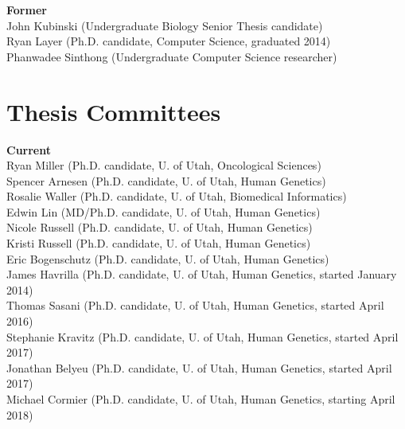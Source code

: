 \documentclass[margin,line]{cv}
\begin{document}
\begin{resume}
    \textbf{Former} \\
    John Kubinski (Undergraduate Biology Senior Thesis candidate)  \\
    Ryan Layer (Ph.D. candidate, Computer Science, graduated 2014) \\
    Phanwadee Sinthong (Undergraduate Computer Science researcher) \\



    \section{\mysidestyle Thesis Committees}
    
    \textbf{Current}\\
    Ryan Miller (Ph.D. candidate, U. of Utah, Oncological Sciences)\\
    Spencer Arnesen (Ph.D. candidate, U. of Utah, Human Genetics)\\
    Rosalie Waller (Ph.D. candidate, U. of Utah, Biomedical Informatics)\\
    Edwin Lin (MD/Ph.D. candidate, U. of Utah, Human Genetics)\\
    Nicole Russell (Ph.D. candidate, U. of Utah, Human Genetics)\\
    Kristi Russell (Ph.D. candidate, U. of Utah, Human Genetics)\\
    Eric Bogenschutz (Ph.D. candidate, U. of Utah, Human Genetics)\\
    James Havrilla (Ph.D. candidate, U. of Utah, Human Genetics, started January 2014) \\
    Thomas Sasani (Ph.D. candidate, U. of Utah, Human Genetics, started April 2016) \\
    Stephanie Kravitz (Ph.D. candidate, U. of Utah, Human Genetics, started April 2017) \\
    Jonathan Belyeu (Ph.D. candidate, U. of Utah, Human Genetics, started April 2017) \\
    Michael Cormier (Ph.D. candidate, U. of Utah, Human Genetics, starting April 2018) \\



\end{resume}
\end{document}
